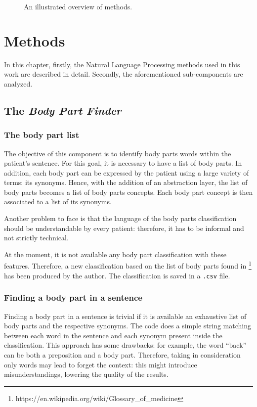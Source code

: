 \begin{figure}[h]

\vspace*{\fill}
\noindent
\hspace*{-\oddsidemargin}%
\vspace*{\fill}

\caption{An illustrated overview of methods.}
\end{figure}

\newpage
\chapter{Methods}
\label{cha:methods}
In this chapter, firstly, the Natural Language Processing methods used in this work are described in detail. Secondly, the aforementioned sub-components are analyzed.

\section{The \textit{Body Part Finder}}
\label{sec:body_part_finder}
\subsection{The body part list}
The objective of this component is to identify body parts words within the patient's sentence. For this goal, it is necessary to have a list of body parts. In addition, each body part can be expressed by the patient using a large variety of terms: its synonyms. Hence, with the addition of an abstraction layer, the list of body parts becomes a list of body parts concepts. Each body part concept is then associated to a list of its synonyms. 

Another problem to face is that the language of the body parts classification should be understandable by every patient: therefore, it has to be informal and not strictly technical.

At the moment, it is not available any body part classification with these features. Therefore, a new classification based on the list of body parts found in \footnote{https://en.wikipedia.org/wiki/Glossary\_of\_medicine} \cite{bodypartswiki} has been produced by the author. The classification is saved in a \texttt{.csv} file.

\subsection{Finding a body part in a sentence}
Finding a body part in a sentence is trivial if it is available an exhaustive list of body parts and the respective synonyms. The code does a simple string matching between each word in the sentence and each synonym present inside the classification. This approach has some drawbacks: for example, the word “back” can be both a preposition and a body part. Therefore, taking in consideration only words may lead to forget the context: this might introduce misunderstandings, lowering the quality of the results.


